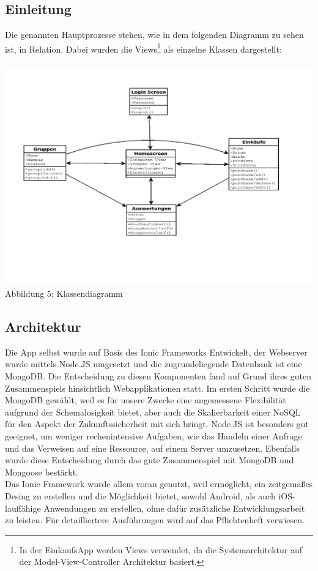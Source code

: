 \documentclass[12pt,a4paper]{article}
\begin{document}
\subsection*{Einleitung}
Die genannten Hauptprozesse stehen, wie in dem folgenden Diagramm zu sehen ist, in Relation. Dabei wurden die Views\footnote {In der EinkaufsApp werden Views verwendet, da die Systemarchitektur auf der Model-View-Controller Architektur basiert.}  als einzelne Klassen dargestellt:
\\
\\
\hspace*{-10mm} 
\includegraphics[trim = 17mm 30mm 0mm 20mm,clip,scale=0.7]{Klassendiagramm.pdf}
\\
\footnotesize Abbildung 5: Klassendiagramm
\normalsize

\subsection{Architektur}

Die App selbst wurde auf Basis des Ionic Frameworks Entwickelt, der Webserver wurde mittels Node.JS umgesetzt und die zugrundeliegende Datenbank ist eine MongoDB. Die Entscheidung zu diesen Komponenten fand auf Grund ihres guten Zusammenspiels hinsichtlich Webapplikationen statt. Im ersten Schritt wurde die MongoDB gewählt, weil es für unsere Zwecke eine angemessene Flexibilität aufgrund der Schemalosigkeit bietet, aber auch die Skalierbarkeit einer NoSQL für den Aspekt der Zukunftssicherheit mit sich bringt. Node.JS ist besonders gut geeignet, um weniger rechenintensive Aufgaben, wie das Handeln einer Anfrage und das Verweisen auf eine Ressource, auf einem Server umzusetzen. Ebenfalls wurde diese Entscheidung durch das gute Zusammenspiel mit MongoDB und Mongoose bestärkt. 
\\
Das Ionic Framework wurde allem voran genutzt, weil ermöglicht, ein zeitgemäßes Desing zu erstellen und die Möglichkeit bietet, sowohl Android, als auch iOS-lauffähige Anwendungen zu erstellen, ohne dafür zusätzliche Entwicklungsarbeit zu leisten.
Für detailliertere Ausführungen wird auf das Pflichtenheft verwiesen.
\end{document}
